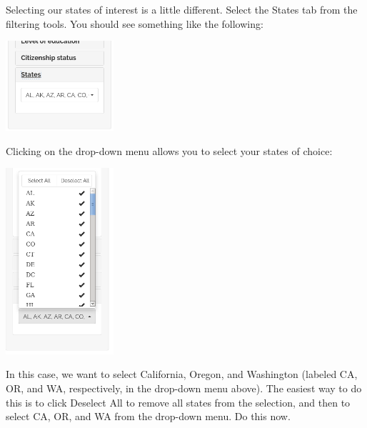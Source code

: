 \documentclass[letterpaper,12pt]{article}
\begin{document}
\begin{enumerate}
  Selecting our states of interest is a little different. Select the
  States tab from the filtering tools. You should see something like
  the following:
  \begin{center}
    \includegraphics[width=0.3\textwidth]{images/trends_ex1/state_selection.png}
  \end{center}
  Clicking on the drop-down menu allows you to select your states of
  choice:
  \begin{center}
    \includegraphics[width=0.3\textwidth]{images/trends_ex1/state_drop_down.png}
  \end{center}
  In this case, we want to select California, Oregon, and Washington
  (labeled CA, OR, and WA, respectively, in the drop-down menu
  above). The easiest way to do this is to click Deselect All to
  remove all states from the selection, and then to select CA, OR, and
  WA from the drop-down menu. Do this now.


\end{enumerate}
\end{document}
